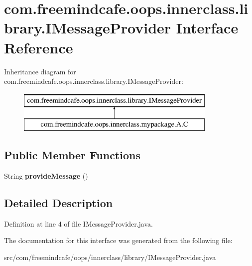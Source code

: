 \hypertarget{interfacecom_1_1freemindcafe_1_1oops_1_1innerclass_1_1library_1_1_i_message_provider}{}\section{com.\+freemindcafe.\+oops.\+innerclass.\+library.\+I\+Message\+Provider Interface Reference}
\label{interfacecom_1_1freemindcafe_1_1oops_1_1innerclass_1_1library_1_1_i_message_provider}
Inheritance diagram for com.\+freemindcafe.\+oops.\+innerclass.\+library.\+I\+Message\+Provider\+:\begin{figure}[H]
\begin{center}
\leavevmode
\includegraphics[height=2.000000cm]{interfacecom_1_1freemindcafe_1_1oops_1_1innerclass_1_1library_1_1_i_message_provider}
\end{center}
\end{figure}
\subsection*{Public Member Functions}
\begin{DoxyCompactItemize}
\item 
\hypertarget{interfacecom_1_1freemindcafe_1_1oops_1_1innerclass_1_1library_1_1_i_message_provider_a8d062682112f86f6d3bbd86c1aeae088}{}String {\bfseries provide\+Message} ()\label{interfacecom_1_1freemindcafe_1_1oops_1_1innerclass_1_1library_1_1_i_message_provider_a8d062682112f86f6d3bbd86c1aeae088}

\end{DoxyCompactItemize}


\subsection{Detailed Description}


Definition at line 4 of file I\+Message\+Provider.\+java.



The documentation for this interface was generated from the following file\+:\begin{DoxyCompactItemize}
\item 
src/com/freemindcafe/oops/innerclass/library/I\+Message\+Provider.\+java\end{DoxyCompactItemize}
